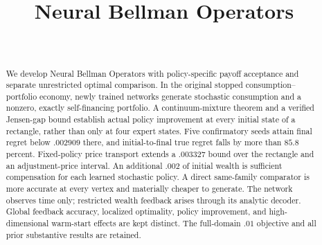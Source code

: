 \documentclass[ecta]{econsocart}
\theoremstyle{remark}
\begin{document}
\begin{frontmatter}
\title{Neural Bellman Operators}
\begin{aug}
\author[id=au1,addressref={add1}]{~}
\address[id=add1]{}
\end{aug}
\begin{abstract}
We develop Neural Bellman Operators with policy-specific payoff acceptance and separate unrestricted optimal comparison. In the original stopped consumption--portfolio economy, newly trained networks generate stochastic consumption and a nonzero, exactly self-financing portfolio. A continuum-mixture theorem and a verified Jensen-gap bound establish actual policy improvement at every initial state of a rectangle, rather than only at four expert states. Five confirmatory seeds attain final regret below $.002909$ there, and initial-to-final true regret falls by more than $85.8$ percent. Fixed-policy price transport extends a $.003327$ bound over the rectangle and an adjustment-price interval. An additional $.002$ of initial wealth is sufficient compensation for each learned stochastic policy. A direct same-family comparator is more accurate at every vertex and materially cheaper to generate. The network observes time only; restricted wealth feedback arises through its analytic decoder. Global feedback accuracy, localized optimality, policy improvement, and high-dimensional warm-start effects are kept distinct. The full-domain $.01$ objective and all prior substantive results are retained.
\end{abstract}
\begin{keyword}
\end{keyword}
\end{frontmatter}

\begin{appendix}





\end{appendix}
\clearpage

\end{document}
